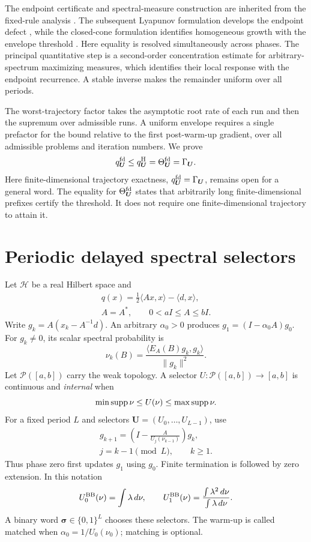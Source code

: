 \documentclass[letterpaper,twoside]{article}
\begin{document}
The endpoint certificate and spectral-measure construction are inherited from the fixed-rule analysis \cite{YangYuan2026}. The subsequent Lyapunov formulation develops the endpoint defect \cite{YangYuanLyapunov2026}, while the closed-cone formulation identifies homogeneous growth with the envelope threshold \cite{YangYuanCone2026}. Here equality is resolved simultaneously across phases. The principal quantitative step is a second-order concentration estimate for arbitrary-spectrum maximizing measures, which identifies their local response with the endpoint recurrence. A stable inverse makes the remainder uniform over all periods.

The worst-trajectory factor takes the asymptotic root rate of each run and then the supremum over admissible runs. A uniform envelope requires a single prefactor for the bound relative to the first post-warm-up gradient, over all admissible problems and iteration numbers. We prove
\begin{equation}\label{eq:hierarchy}
 q^{\rm fd}_{\bm U}\le q^{\rm H}_{\bm U}
 =\Theta^{\rm fd}_{\bm U}=\Gamma_{\bm U}.
\end{equation}
Here finite-dimensional trajectory exactness, $q^{\rm fd}_{\bm U}=\Gamma_{\bm U}$, remains open for a general word. The equality for $\Theta^{\rm fd}_{\bm U}$ states that arbitrarily long finite-dimensional prefixes certify the threshold. It does not require one finite-dimensional trajectory to attain it.

\section{Periodic delayed spectral selectors}\label{sec:setting}
Let $\mathcal H$ be a real Hilbert space and
\[
\begin{gathered}
 q(x)=\tfrac12\langle Ax,x\rangle-\langle d,x\rangle,\\
 A=A^*,\qquad 0<aI\le A\le bI.
\end{gathered}
\]
Write $g_k=A(x_k-A^{-1}d)$. An arbitrary $\alpha_0>0$ produces $g_1=(I-\alpha_0A)g_0$.
For $g_k\ne0$, its scalar spectral probability is
\[
 \nu_k(B)=\frac{\langle E_A(B)g_k,g_k\rangle}{\|g_k\|^2}.
\]
Let $\mathcal P([a,b])$ carry the weak topology. A selector $U:\mathcal P([a,b])\to[a,b]$ is continuous and \emph{internal} when
\[
 \min\operatorname{supp}\nu\le U(\nu)\le\max\operatorname{supp}\nu.
\]
For a fixed period $L$ and selectors $\bm U=(U_0,\ldots,U_{L-1})$, use
\begin{equation}\label{eq:iteration}
\begin{gathered}
 g_{k+1}=\left(I-\frac{A}{U_j(\nu_{k-1})}\right)g_k,\\
 j=k-1\pmod L,\qquad k\ge1.
\end{gathered}
\end{equation}
Thus phase zero first updates $g_1$ using $g_0$. Finite termination is followed by zero extension. In this notation
\[
 U_0^{\rm BB}(\nu)=\int\lambda\,d\nu,\qquad
 U_1^{\rm BB}(\nu)=\frac{\int\lambda^2\,d\nu}{\int\lambda\,d\nu}.
\]
A binary word $\bm\sigma\in\{0,1\}^L$ chooses these selectors. The warm-up is called matched when $\alpha_0=1/U_0(\nu_0)$; matching is optional.
\end{document}
